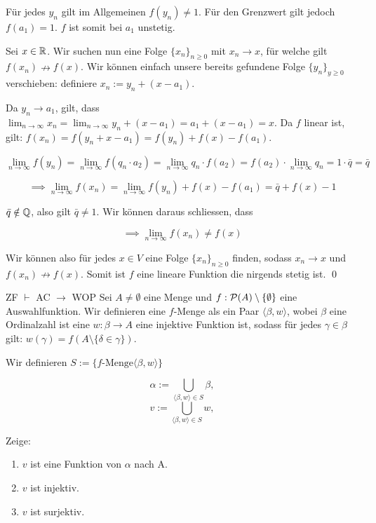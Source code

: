 \documentclass[12pt]{article}
\begin{document}
Für jedes $y_n$ gilt im Allgemeinen $f(y_n) \neq 1$. Für den Grenzwert gilt jedoch $f(a_1) = 1$. $f$ ist somit bei $a_1$ unstetig.


Sei $x \in \mathbb{R}$. Wir suchen nun eine Folge $\{x_n\}_{n \geq 0}$ mit $x_n \rightarrow x$, für welche gilt $f(x_n) \nrightarrow f(x)$. Wir können einfach unsere bereits gefundene Folge $\{y_n\}_{y \geq 0}$ verschieben: definiere $x_n := y_n + (x - a_1)$.

Da $y_n \rightarrow a_1$, gilt, dass $\lim_{n \rightarrow \infty} x_n = \lim_{n \rightarrow \infty} y_n + (x - a_1) = a_1 + (x - a_1) = x$. Da $f$ linear ist, gilt: $f(x_n) = f(y_n + x - a_1) = f(y_n) + f(x) - f(a_1)$.

$$
\lim_{n \rightarrow \infty} f(y_n) = \lim_{n \rightarrow \infty} f(q_n \cdot a_2) = \lim_{n \rightarrow \infty} q_n \cdot f(a_2) = f(a_2) \cdot \lim_{n \rightarrow \infty} q_n = 1 \cdot \bar{q} = \bar{q}
$$

$$
\implies \lim_{n \rightarrow \infty} f(x_n) = \lim_{n \rightarrow \infty} f(y_n) + f(x) - f(a_1) = \bar{q} + f(x) - 1
$$

$\bar{q} \notin \mathbb{Q}$, also gilt $\bar{q} \neq 1$. Wir können daraus schliessen, dass

$$
\implies \lim_{n \rightarrow \infty} f(x_n) \neq f(x)
$$

Wir können also für jedes $x \in V$ eine Folge $\{x_n\}_{n \geq 0}$ finden, sodass $x_n \rightarrow x$ und $f(x_n) \nrightarrow f(x)$. Somit ist $f$ eine lineare Funktion die nirgends stetig ist. \qed


\begin{problem}[Aufgabe]{ZF $\vdash$ AC $\rightarrow$ WOP}{}
    Sei $A \neq \emptyset$ eine Menge und $f: \mathcal{P}(A) \setminus \{\emptyset\}$ eine Auswahlfunktion. Wir definieren eine $f$-Menge als ein Paar $\langle \beta, w \rangle$, wobei $\beta$ eine Ordinalzahl ist eine $w: \beta \rightarrow A$ eine injektive Funktion ist, sodass für jedes $\gamma \in \beta$ gilt: $w(\gamma) = f(A \setminus \{\delta \in \gamma\})$.

    Wir definieren $S := \{f\text{-Menge} \langle \beta, w \rangle\}$

    $$
        \alpha := \bigcup\limits_{\langle \beta, w \rangle \in S} \beta,
    $$
    $$
        v := \bigcup\limits_{\langle \beta, w \rangle \in S} w,
    $$

    Zeige:

    \begin{enumerate}[label=(\alph*)]
        \item $v$ ist eine Funktion von $\alpha$ nach A.
        \item $v$ ist injektiv.
        \item $v$ ist surjektiv.
    \end{enumerate}
\end{problem}
\end{document}
